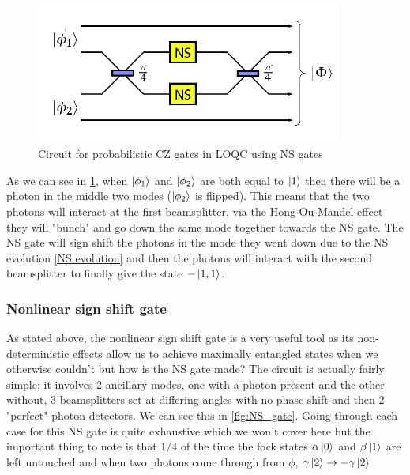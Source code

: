 \begin{figure}[h]
    \centering
    \includegraphics[width=0.9\textwidth]{images/CZ-gate.png}
    \caption{Circuit for probabilistic CZ gates in LOQC using NS gates}\label{fig:CZ_gate}
\end{figure}

As we can see in \ref{fig:CZ_gate}, when $\ket{\phi_1}$ and $\ket{\phi_2}$ are both equal to $\ket{1}$ then there will be a photon in the middle two modes ($\ket{\phi_2}$ is flipped). This means that the two photons will interact at the first beamsplitter, via the Hong-Ou-Mandel effect they will "bunch" and go down the same mode together towards the NS gate. The NS gate will sign shift the photons in the mode they went down due to the NS evolution \ref{NS evolution} and then the photons will interact with the second beamsplitter to finally give the state $-\ket{1,1}$.%

\subsubsection{Nonlinear sign shift gate}
As stated above, the nonlinear sign shift gate is a very useful tool as its non-deterministic effects allow us to achieve maximally entangled states when we otherwise couldn't but how is the NS gate made? The circuit is actually fairly simple; it involves 2 ancillary modes, one with a photon present and the other without, 3 beamsplitters set at differing angles with no phase shift and then 2 "perfect" photon detectors. We can see this in \ref{fig:NS_gate}. Going through each case for this NS gate is quite exhaustive which we won't cover here but the important thing to note is that 1/4 of the time the fock states $\alpha\ket{0}$ and $\beta\ket{1}$ are left untouched and when two photons come through from $\phi$, $\gamma\ket{2} \rightarrow -\gamma\ket{2}$ 

